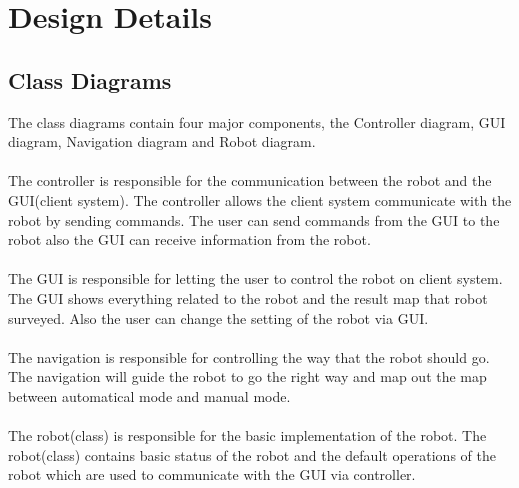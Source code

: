 \documentclass[11pt, a4paper]{report}
\begin{document}
\chapter{Design Details}%
\label{cha:DD2}

\section{Class Diagrams}
The class diagrams contain four major components, the Controller diagram, GUI diagram, Navigation diagram and Robot diagram.\\ \\
The controller is responsible for the communication between the robot and the GUI(client system).  The controller allows the client system communicate with the robot by sending commands. The user can send commands from the GUI to the robot also the GUI can receive information from the robot.\\ \\
The GUI is responsible for letting the user to control the robot on client system. The GUI shows everything related to the robot and the result map that robot surveyed. Also the user can change the setting of the robot via GUI.\\ \\
The navigation is responsible for controlling the way that the robot should go. The navigation will guide the robot to go the right way and map out the map between automatical mode and manual mode. \\ \\
The robot(class) is responsible for the basic implementation of the robot. The robot(class) contains basic status of the robot and the default operations of the robot which are used to communicate with the GUI via controller.
\end{document}
